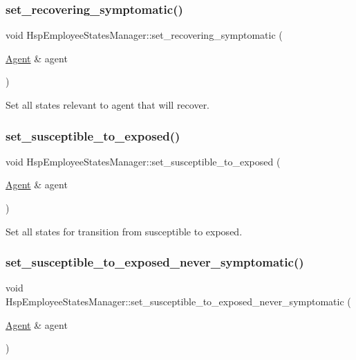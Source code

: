 \subsubsection{\texorpdfstring{set\+\_\+recovering\+\_\+symptomatic()}{set\_recovering\_symptomatic()}}
{\footnotesize\ttfamily void Hsp\+Employee\+States\+Manager\+::set\+\_\+recovering\+\_\+symptomatic (\begin{DoxyParamCaption}\item[{\hyperlink{classAgent}{Agent} \&}]{agent }\end{DoxyParamCaption})}



Set all states relevant to agent that will recover. 

\mbox{\label{classHspEmployeeStatesManager_a4fea72f10a69fe01212a847b43969f3e}} 
\subsubsection{\texorpdfstring{set\+\_\+susceptible\+\_\+to\+\_\+exposed()}{set\_susceptible\_to\_exposed()}}
{\footnotesize\ttfamily void Hsp\+Employee\+States\+Manager\+::set\+\_\+susceptible\+\_\+to\+\_\+exposed (\begin{DoxyParamCaption}\item[{\hyperlink{classAgent}{Agent} \&}]{agent }\end{DoxyParamCaption})}



Set all states for transition from susceptible to exposed. 

\mbox{\label{classHspEmployeeStatesManager_aa745324359627d4497c255be7b9615e1}} 
\subsubsection{\texorpdfstring{set\+\_\+susceptible\+\_\+to\+\_\+exposed\+\_\+never\+\_\+symptomatic()}{set\_susceptible\_to\_exposed\_never\_symptomatic()}}
{\footnotesize\ttfamily void Hsp\+Employee\+States\+Manager\+::set\+\_\+susceptible\+\_\+to\+\_\+exposed\+\_\+never\+\_\+symptomatic (\begin{DoxyParamCaption}\item[{\hyperlink{classAgent}{Agent} \&}]{agent }\end{DoxyParamCaption})}




